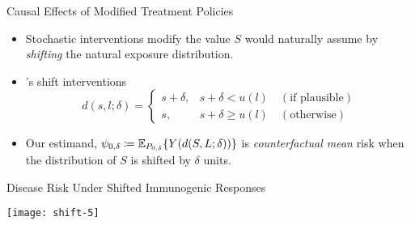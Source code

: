 \documentclass{beamer}
\begin{document}
\begin{frame}[c]{Causal Effects of Modified Treatment Policies}

\begin{center}
\begin{itemize}
  \itemsep8pt
  \item Stochastic interventions modify the value $S$ would naturally assume by
    \textit{shifting} the natural exposure distribution.
  \item \cite{diaz2012population, diaz2018stochastic}'s shift
    interventions\footnotemark
    \begin{equation*}\label{shift_intervention}
      d(s, l; \delta) =
        \begin{cases}
          s + \delta, & s + \delta < u(l) \quad (\text{if plausible}) \\
          s, & s + \delta \geq u(l) \quad (\text{otherwise})
        \end{cases}
    \end{equation*}
  \item Our estimand, $\psi_{0,\delta} \coloneqq
    \mathbb{E}_{P_{0, \delta}}\{Y(d(S,L;\delta))\}$ is \textit{counterfactual mean}
    risk when the distribution of $S$ is shifted by $\delta$ units.
\end{itemize}
\end{center}

\note{
}


\end{frame}


\begin{frame}[c]{Disease Risk Under Shifted Immunogenic Responses}

\hspace*{-1cm}\texttt{[image: shift-5]}

\note{
}

\end{frame}
\end{document}
